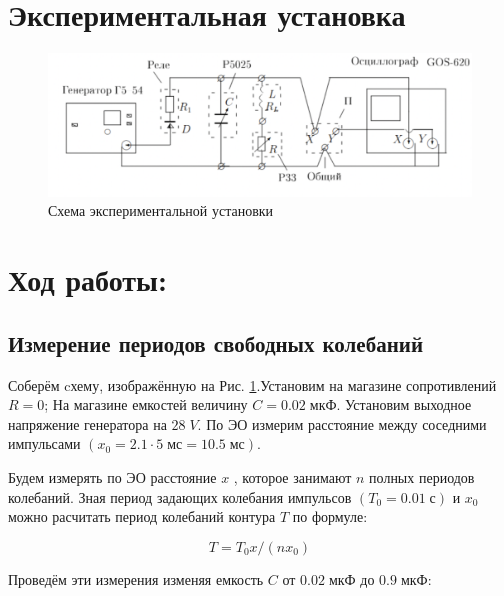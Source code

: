 \documentclass[11pt]{article}
\begin{document}
\section{Экспериментальная установка}

\begin{figure}[H]
    \includegraphics[width=\textwidth]{scheme.png}
    \caption{Схема экспериментальной установки}
    \label{fig:sheme}
\end{figure}

\section{Ход работы:}
\subsection{Измерение периодов свободных колебаний} \label{sec:T}

Соберём cхему, изображённую на Рис. \ref{fig:sheme}.Установим на магазине сопротивлений \(R = 0\); На магазине емкостей
величину \( C = 0.02\; мкФ \). Установим выходное напряжение генератора на \( 28\; V \). По ЭО измерим расстояние между соседними
импульсами \( (x_0 = 2.1 \cdot 5\; мс = 10.5\; мс ) \).

Будем измерять по ЭО расстояние \( x \) , которое занимают \( n \) полных периодов колебаний. Зная период задающих
колебания импульсов \( ( T_0 = 0.01\; с ) \) и \( x_0 \) можно расчитать период колебаний контура \( T \) по формуле:

\[ T = T_0x/(nx_0) \]

Проведём эти измерения изменяя емкость \( C \) от \( 0.02\; мкФ \) до \( 0.9\; мкФ \):
\end{document}
